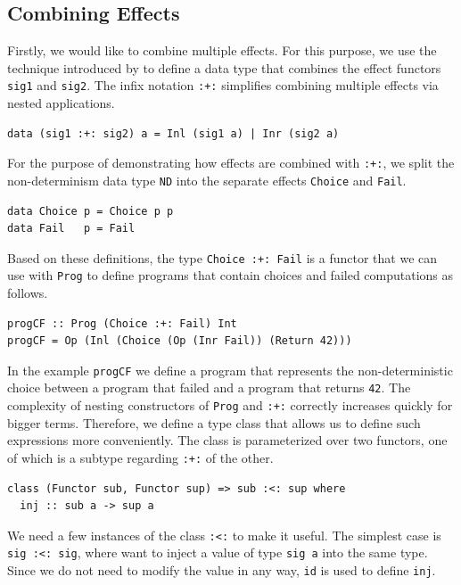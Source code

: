 \documentclass[a4paper, 11pt, fleqn, twoside]{scrreprt}
\newcommand{\hinl}[1]{\texttt{#1}}
\newcommand{\cinl}[1]{\texttt{#1}}
\begin{document}
\subsection{Combining Effects}
Firstly, we would like to combine multiple effects.
For this purpose, we use the technique introduced by \citet{swierstra2008} to define a data type that combines the effect functors \hinl{sig1} and \hinl{sig2}.
The infix notation \hinl{:+:} simplifies combining multiple effects via nested applications.

\begin{verbatim}
data (sig1 :+: sig2) a = Inl (sig1 a) | Inr (sig2 a)
\end{verbatim}

For the purpose of demonstrating how effects are combined with \cinl{:+:}, we split the non-determinism data type \hinl{ND} into the separate effects \hinl{Choice} and \hinl{Fail}.

\begin{verbatim}
data Choice p = Choice p p
data Fail   p = Fail
\end{verbatim}

Based on these definitions, the type \hinl{Choice :+: Fail} is a functor that we can use with \hinl{Prog} to define programs that contain choices and failed computations as follows.

\begin{verbatim}
progCF :: Prog (Choice :+: Fail) Int
progCF = Op (Inl (Choice (Op (Inr Fail)) (Return 42)))
\end{verbatim}

In the example \hinl{progCF} we define a program that represents the non-deterministic choice between a program that failed and a program that returns \hinl{42}.
The complexity of nesting constructors of \hinl{Prog} and \hinl{:+:} correctly increases quickly for bigger terms.
Therefore, we define a type class that allows us to define such expressions more conveniently.
The class is parameterized over two functors, one of which is a subtype regarding \hinl{:+:} of the other.

\begin{verbatim}
class (Functor sub, Functor sup) => sub :<: sup where
  inj :: sub a -> sup a
\end{verbatim}

We need a few instances of the class \hinl{:<:} to make it useful.
The simplest case is \hinl{sig :<: sig}, where want to inject a value of type \hinl{sig a} into the same type.
Since we do not need to modify the value in any way, \hinl{id} is used to define \hinl{inj}.
\end{document}
